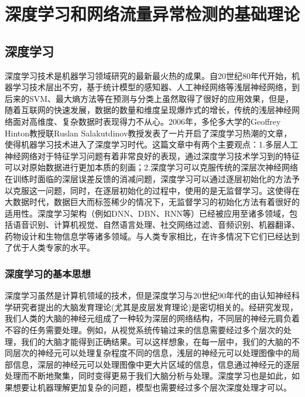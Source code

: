 
\chapter{深度学习和网络流量异常检测的基础理论}\label{chap:example}

\section{深度学习}

深度学习技术是机器学习领域研究的最新最火热的成果。自20世纪80年代开始，机器学习技术层出不穷，基于统计模型的感知器、人工神经网络等浅层神经网络，到后来的SVM、最大熵方法等在预测与分类上虽然取得了很好的应用效果，但是，随着互联网的快速发展，数据的数量和维度呈现爆炸式的增长，传统的浅层神经网络面对高维度、复杂数据时表现得力不从心。2006年，多伦多大学的Geoffrey Hinton教授联Ruslan Salakutdinov教授发表了一片开启了深度学习热潮的文章，使得机器学习技术进入了深度学习时代。这篇文章中有两个主要观点：1.多层人工神经网络对于特征学习问题有着非常良好的表现，通过深度学习技术学习到的特征可以对原始数据进行更加本质的刻画；2.深度学习可以克服传统的深层次神经网络在训练时面临的深层误差反馈的消减问题，深度学习可以通过逐层初始化的方法予以克服这一问题，同时，在逐层初始化的过程中，使用的是无监督学习。这使得在大数据时代，数据巨大而标签稀少的情况下，无监督学习的初始化方法有着很好的适用性。深度学习架构（例如DNN、DBN、RNN等）已经被应用至诸多领域，包括语音识别、计算机视觉、自然语言处理、社交网络过滤、音频识别、机器翻译、药物设计和生物信息学等诸多领域。与人类专家相比，在许多情况下它们已经达到了优于人类专家的水平。

\subsection{深度学习的基本思想}

深度学习虽然是计算机领域的技术，但是深度学习与20世纪90年代的由认知神经科学研究者提出的大脑发育理论(尤其是皮层发育理论)是密切相关的。经研究发现，我们人类的大脑的神经元组成了一种较为深层的网络结构，不同层的神经元肩负着不容的任务需要处理。例如，从视觉系统传输过来的信息需要经过多个层次的处理，我们的大脑才能得到正确结果。可以这样想象，在每一层中，我们的大脑的不同层次的神经元可以处理复杂程度不同的信息，浅层的神经元可以处理图像中的局部信息，深层的神经元可以处理图像中更大片区域的信息，信息通过神经元的逐层处理而不断地聚集，同时变得更易于我们大脑分析与处理。深度学习也是如此，如果想要让机器理解更加复杂的问题，模型也需要经过多个层次深度处理才可以。

